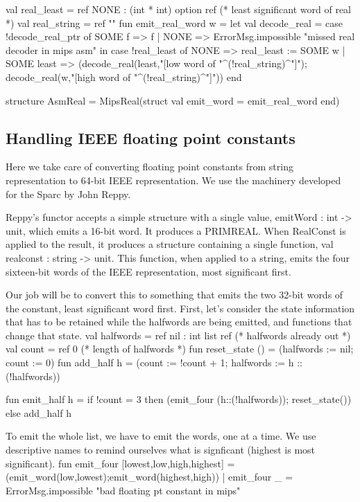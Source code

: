 val real_least = ref NONE : (int * int) option ref
                                   (* least significant word of real *)
val real_string = ref ""
fun emit_real_word w =
    let val decode_real = case !decode_real_ptr of 
                  SOME f => f 
                | NONE => ErrorMsg.impossible "missed real decoder in mips asm"
    in
        case !real_least of 
            NONE => real_least := SOME w
          | SOME least => 
                (decode_real(least,"[low  word of "^(!real_string)^"]");
                 decode_real(w,"[high word of "^(!real_string)^"]"))
    end

structure AsmReal = MipsReal(struct val emit_word = emit_real_word end)

\endcode
{}
\subsection{Handling IEEE floating point constants}
Here we take care of converting floating point constants from
string representation to 64-bit IEEE representation.
We use the machinery developed for the Sparc by John Reppy.

Reppy's functor accepts a simple structure with a single value,
\code{}emitWord : int -> unit\edoc{}, which emits a 16-bit word.
It produces a \code{}PRIMREAL\edoc{}.
When \code{}RealConst\edoc{} is applied to the result, it produces a 
structure containing a single function, \code{}val realconst : string -> unit\edoc{}.
This function, when applied to a string, emits the four sixteen-bit words
of the IEEE representation, most significant first.

Our job will be to convert this to something that emits the two 32-bit
words of the constant, least significant word first.
First, let's consider the state information that has to be retained
while the halfwords are being emitted, and functions that change that state.
\enddocs
{}
\endmoddef
val halfwords = ref nil : int list ref          (* halfwords already out *)
val count = ref 0                               (* length of halfwords *)
fun reset_state () = (halfwords := nil; count := 0)
fun add_half h = (count := !count + 1; halfwords := h :: (!halfwords))

\endcode
{}
\endmoddef
fun emit_half h = 
    if !count = 3 then (emit_four (h::(!halfwords)); reset_state())
    else add_half h

\endcode
{}
To emit the whole list, we have to emit the words, one at a time.
We use descriptive names to remind ourselves what is signficant
(highest is most significant).
\enddocs
{}
\endmoddef
fun emit_four [lowest,low,high,highest] = 
                        (emit_word(low,lowest);emit_word(highest,high))
  | emit_four _ = ErrorMsg.impossible "bad floating pt constant in mips"

